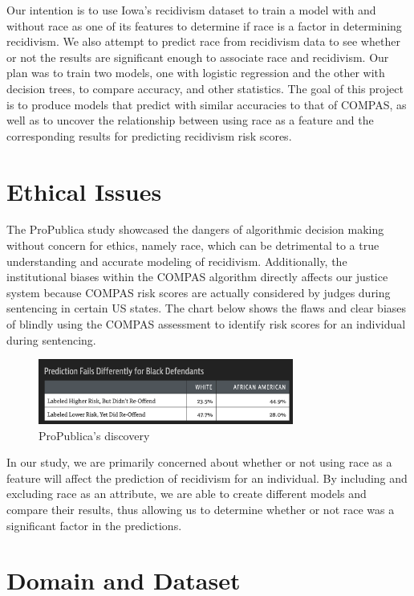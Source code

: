 \documentclass[11pt, sigconf]{acmart}
\begin{document}
Our intention is to use Iowa’s recidivism dataset to train a model with and without race as one of its features to determine if race is a factor in determining recidivism. We also attempt to predict race from recidivism data to see whether or not the results are significant enough to associate race and recidivism. Our plan was to train two models, one with logistic regression and the other with decision trees, to compare accuracy,  and other statistics.  The goal of this project is to produce models that predict with similar accuracies to that of COMPAS, as well as to uncover the relationship between using race as a feature and the corresponding results for predicting recidivism risk scores.

\section{Ethical Issues}

\hspace{5mm}The ProPublica study showcased the dangers of algorithmic decision making without concern for ethics, namely race, which can be detrimental to a true understanding and accurate modeling of recidivism. Additionally, the institutional biases within the COMPAS algorithm directly affects our  justice system because COMPAS risk scores are actually considered by judges during sentencing in certain US states. The chart below shows the flaws and clear biases of blindly using the COMPAS assessment to identify risk scores for an individual during sentencing.  
\begin{figure}[h] 	
\centering
\includegraphics[width=3.3in]{asdf.png}
\caption{ProPublica's discovery}
\end{figure}


In our study, we are primarily concerned about whether or not using race as a feature will affect the prediction of recidivism for an individual. By including and excluding race as an attribute, we are able to create different models and compare their results, thus allowing us to determine whether or not race was a significant factor in the predictions.


\section{Domain and Dataset}
\end{document}
